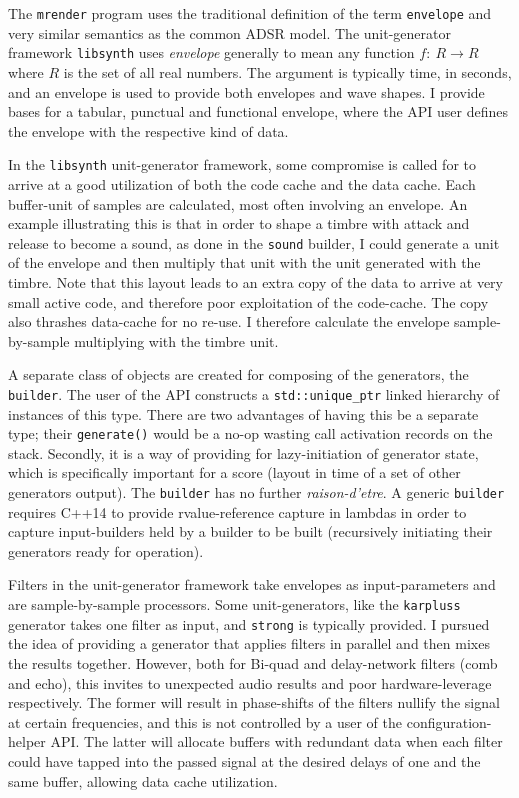 \documentclass{article}
\begin{document}
The \texttt{mrender} program uses the traditional definition
of the term \verb|envelope|
and very similar semantics as the common ADSR model.  The unit-generator
framework \texttt{libsynth} uses \textit{envelope} generally to mean any 
function $f:\: R\longrightarrow R$ where $R$ is the set of all real numbers.
The argument is typically time, in seconds, and an envelope
is used to provide both envelopes and wave shapes.
I provide bases for a tabular, punctual and functional envelope, where
the API user defines the envelope with the respective kind of data.

In the \texttt{libsynth} unit-generator framework, some compromise is called for
to arrive at a good utilization of both the code cache and the data cache.
Each buffer-unit of samples are calculated, most often involving an envelope.
An example illustrating this is that in order to shape a timbre with attack
and release to become a sound, as done in the \verb|sound| builder, I could
generate a unit of the envelope and then multiply that unit with the unit
generated with the timbre.
Note that this layout leads to an extra copy of the data to arrive at very
small active code, and therefore poor exploitation of the code-cache.  The
copy also thrashes data-cache for no re-use.
I therefore calculate the envelope sample-by-sample multiplying with the timbre unit.

A separate class of objects are created for composing of the generators,
the \verb|builder|.
The user of the API constructs a \verb|std::unique_ptr| linked hierarchy of instances
of this type.
There are two advantages of having this be a separate type; their \verb|generate()|
would be a no-op wasting call activation records on the stack.
Secondly, it is a way of providing for lazy-initiation of generator state,
which is specifically important for a score (layout in time of a
set of other generators output).
The \verb|builder| has no further \textit{raison-d'etre}.
A generic \verb|builder| requires C++14 to provide
rvalue-reference capture in lambdas in order to capture input-builders
held by a builder to be built (recursively initiating their generators
ready for operation).

Filters in the unit-generator framework
take envelopes as input-parameters and are sample-by-sample processors.
Some unit-generators, like the \verb|karpluss| generator takes one filter as
input, and \verb|strong| is typically provided.
I pursued the idea of providing a generator that applies filters in parallel
and then mixes the results together.
However, both for Bi-quad and delay-network filters (comb and echo), this
invites to unexpected audio results and poor hardware-leverage respectively.
The former will result in phase-shifts of the filters nullify the signal
at certain frequencies, and this is not controlled by a user of the
configuration-helper API.
The latter will allocate buffers with redundant data when each filter
could have tapped into the passed signal at the desired delays of one and
the same buffer, allowing data cache utilization.
\end{document}
